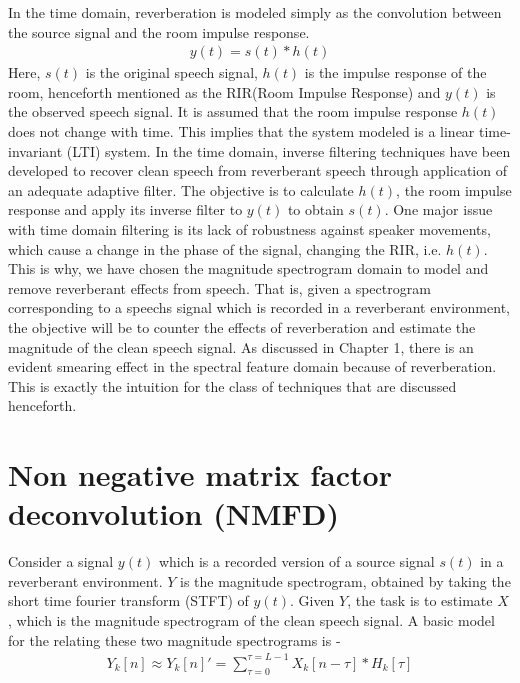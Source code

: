 \documentclass[12pt, a4paper, oneside]{book}
\begin{document}
In the time domain, reverberation is modeled simply as the convolution between the source signal and the room impulse response. 
\begin{align}
y(t) = s(t)*h(t) \label{eq :1}
\end{align}
Here, $s(t)$ is the original speech signal, $h(t)$ is the impulse response of the room, henceforth mentioned as the RIR(Room Impulse Response) and $y(t)$ is the observed speech signal. It is assumed that the room impulse response $h(t)$ does not change with time. This implies that the system modeled is a linear time-invariant (LTI) system. In the time domain, inverse filtering techniques have been developed to recover clean speech from reverberant speech through application of an adequate adaptive filter. The objective is to calculate $h(t)$, the room impulse response and apply its inverse filter to $y(t)$ to obtain $s(t)$. One major issue with time domain filtering is its lack of robustness against speaker movements, which cause a change in the phase of the signal, changing the RIR, i.e. $h(t)$. 
This is why, we have chosen the magnitude spectrogram domain to model and remove reverberant effects from speech. That is, given a spectrogram corresponding to a speechs signal which is recorded in a reverberant environment, the objective will be to counter the effects of reverberation and estimate the magnitude of the clean speech signal. As discussed in Chapter 1, there is an evident smearing effect in the spectral feature domain because of reverberation. This is exactly the intuition for the class of techniques that are discussed henceforth.




 \section{Non negative matrix factor deconvolution (NMFD)}
Consider a signal $y(t)$ which is a recorded version of a source signal $s(t)$ in a reverberant environment.  $Y$ is the magnitude spectrogram, obtained by taking the short time fourier transform (STFT) of $y(t)$. Given $Y$, the task is to estimate $X$, which is the magnitude spectrogram of the clean speech signal. A basic model for the relating these two magnitude spectrograms is \cite{naka} \cite{moham}-
\begin{align} Y_k[n] \approx Y_k[n]' = \sum_{\tau = 0}^{\tau = L-1} X_k[n - \tau] * H_k[\tau] \label{convolution}
 \end{align}
 
\end{document}
